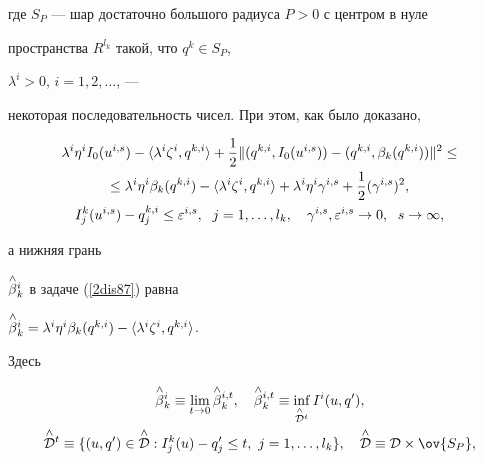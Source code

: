 где $S_P$ --- шар достаточно большого радиуса $P>0$ с центром в нуле


пространства $R^{l_k}$ такой, что $q^k\in S_P$,


$\lambda^i>0$, $i=1,2,\dotsc$, ---


некоторая последовательность чисел. При этом, как было доказано,


\begin{gather}


\lambda^i\eta^i I_0(u^{i,s})-\langle\lambda^i\zeta^i,q^{k,i}\rangle+


\frac 12\|(q^{k,i},I_0(u^{i,s}))-(q^{k,i},\beta_k(q^{k,i}))\|^2\leq\notag\\


%


\label{2dis88}


\le \lambda^i\eta^i\beta_k(q^{k,i})-


\langle\lambda^i\zeta^i,q^{k,i}\rangle+\lambda^i\eta^i\gamma^{i,s}+\frac


12(\gamma^{i,s})^2, \\


%


I^k_j(u^{i,s})-q_j^{k,i}\leq\varepsilon^{i,s},


\ \; j=1,\dotsc,l_k,\quad\gamma^{i,s},


\varepsilon^{i,s}\to 0,\ \; s\to\infty,\notag


\end{gather}


а нижняя грань


$\overset{\wedge}{\beta}{}^i_k$ в задаче (\ref{2dis87}) равна


$\up{\wedge}{\beta}^i_k=\lambda^i\eta^i\beta_k(q^{k,i})-


\langle\lambda^i\zeta^i,q^{k,i}\rangle$.


Здесь


\begin{gather*}


\up{\wedge}{\beta}^i_k\equiv\lim_{t\to


0}\up{\wedge}{\beta}^{i,t}_k,\quad


\up{\wedge}{\beta}^{i,t}_k\equiv\inf_{\up{\wedge}{\cal D}^t}


I^i(u,q'),\\


%


\up{\wedge}{\cal D}^t\equiv\{(u,q')\in


\up{\wedge}{\cal D}:I_j^k(u)-q_j'\leq t,\ j=1,\dotsc,l_k\},\quad


\up{\wedge}{\cal D}\equiv{\cal D}\times\ov{S_P},


\end{gather*}


